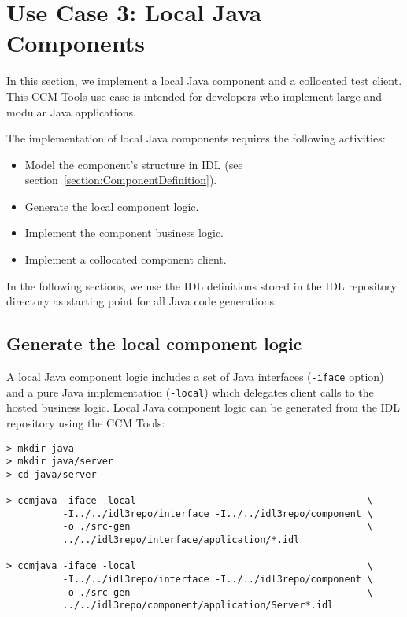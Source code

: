 \section{Use Case 3: Local Java Components}
\label{section:LocalJavaComponentImplementation}

In this section, we implement a local Java component and a collocated test
client.
This CCM Tools use case is intended for developers who implement large and
modular Java applications. 

\vspace{3mm}
The implementation of local Java components requires the following activities:
\begin{itemize}
	\item Model the component's structure in IDL (see section~\ref{section:ComponentDefinition}). 
	\item Generate the local component logic.
	\item Implement the component business logic.
	\item Implement a collocated component client.
\end{itemize}

In the following sections, we use the IDL definitions stored in the IDL
repository directory as starting point for all Java code generations. 


\subsection{Generate the local component logic}
\label{subsection:GenerateJavaComponentLogic}
A local Java component logic includes a set of Java interfaces ({\tt -iface}
option) and a pure Java implementation ({\tt -local}) which
delegates client calls to the hosted business logic. 
Local Java component logic can be generated from the IDL repository using
the CCM Tools:
\begin{footnotesize}
\begin{verbatim}
> mkdir java
> mkdir java/server
> cd java/server
 
> ccmjava -iface -local                                         \
          -I../../idl3repo/interface -I../../idl3repo/component \ 
          -o ./src-gen                                          \
          ../../idl3repo/interface/application/*.idl

> ccmjava -iface -local                                         \
          -I../../idl3repo/interface -I../../idl3repo/component \
          -o ./src-gen                                          \
          ../../idl3repo/component/application/Server*.idl
\end{verbatim}
\end{footnotesize}

